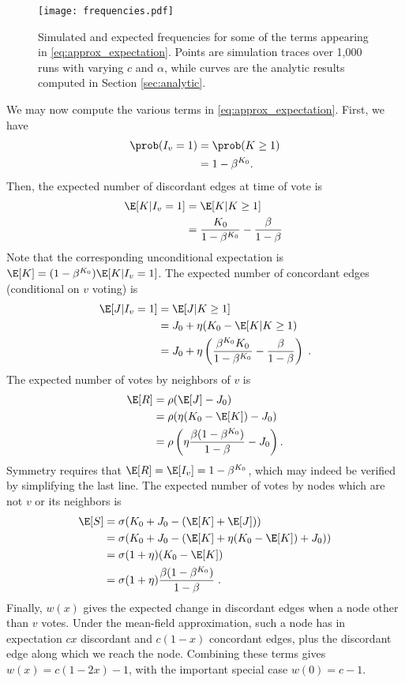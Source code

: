 \documentclass[english]{scrartcl}
\begin{document}
	\begin{figure}
		\centering
		\texttt{[image: frequencies.pdf]}
		\caption{Simulated and expected frequencies for some of the terms appearing in \eqref{eq:approx_expectation}. Points are simulation traces over 1,000 runs with varying $c$ and $\alpha$, while curves are the analytic results computed in Section \ref{sec:analytic}.} \label{fig:frequencies}
	\end{figure}

	We may now compute the various terms in \eqref{eq:approx_expectation}. First, we have 
	\begin{align*}
		\prob(I_v = 1) &= \prob(K \geq 1) \\ 
					   &= 1-\beta^{K_0}.
	\end{align*}
	Then, the expected number of discordant edges at time of vote is
	\begin{align*}
		\E[K|I_v = 1] &= \E[K|K \geq 1] \\ 
					  &= \frac{K_0}{1-\beta^{K_0}} - \frac{\beta}{1-\beta}\;
	\end{align*}
	Note that the corresponding unconditional expectation is $\E[K] = (1-\beta^{K_0})\E[K|I_v = 1]$.
	The expected number of concordant edges (conditional on $v$ voting) is 
	\begin{align*}
		\E[J|I_v = 1] &= \E[J|K \geq 1] \\ 
					  &= J_0 + \eta(K_0 - \E[K|K\geq 1) \\ 
					  &= J_0 + \eta \left(\frac{\beta^{K_0} K_0}{1-\beta^{K_0}} - \frac{\beta}{1-\beta}\right)\;.
	\end{align*}
	The expected number of votes by neighbors of $v$ is 
	\begin{align*}
		\E[R] &= \rho(\E[J] - J_0) \\ 
			  &= \rho(\eta(K_0 - \E[K]) - J_0) \\ 
			  &= \rho\left(\eta\frac{\beta(1-\beta^{K_0})}{1-\beta} - J_0\right).
	\end{align*}
	Symmetry requires that $\E[R] = \E[I_v] = 1-\beta^{K_0}$, which may indeed be verified by simplifying the last line. 
	The expected number of votes by nodes which are not $v$ or its neighbors is 
	\begin{align*}
		\E[S] &= \sigma(K_0 + J_0 - (\E[K] + \E[J])) \\ 
			  &= \sigma(K_0 + J_0 - (\E[K] + \eta(K_0 - \E[K]) + J_0)) \\ 
			  &= \sigma (1 + \eta) (K_0 - \E[K]) \\ 
			  &= \sigma (1 + \eta) \frac{\beta(1-\beta^{K_0})}{1-\beta}\;.
	\end{align*}
	Finally, $w(x)$ gives the expected change in discordant edges when a node other than $v$ votes. Under the mean-field approximation, such a node has in expectation $cx$ discordant and $c(1-x)$ concordant edges, plus the discordant edge along which we reach the node. Combining these terms gives $w(x) = c(1-2x) - 1$, with the important special case $w(0) = c-1$. 
\end{document}
